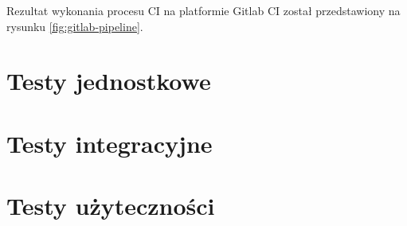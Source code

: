 Rezultat wykonania procesu CI na platformie Gitlab CI został przedstawiony na rysunku \ref{fig:gitlab-pipeline}.


\section{Testy jednostkowe}
\cite{book:testy-jednostkowe}
\section{Testy integracyjne}
\cite{book:testy-jednostkowe}
\section{Testy użyteczności}
\cite{book:testowanie-i-jakosc-oprogramowania}

\thispagestyle{normal}
